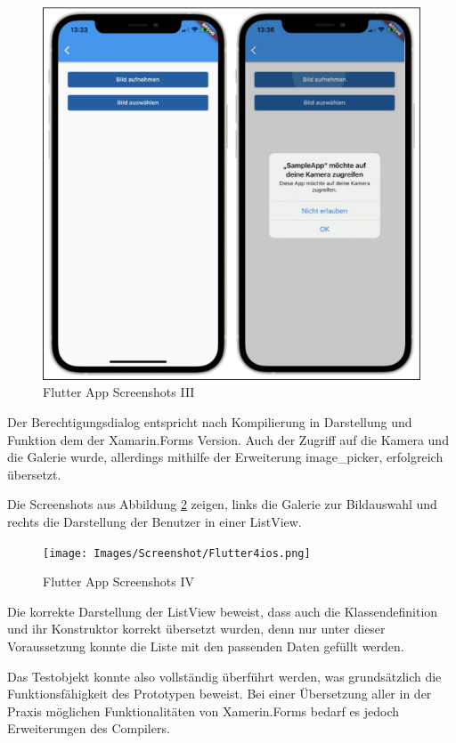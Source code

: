 \begin{figure}[!ht]
 \includegraphics[width=\textwidth,keepaspectratio]{Images/Screenshot/Flutter3ios.png}
 \caption{Flutter App Screenshots III}
 \label{fig:FlutterAppIII}
\end{figure}
Der Berechtigungsdialog entspricht nach Kompilierung in Darstellung und 
Funktion dem der Xamarin.Forms Version.  Auch der Zugriff auf die Kamera und die Galerie wurde, allerdings mithilfe der Erweiterung image\_picker, erfolgreich übersetzt.

Die Screenshots aus Abbildung \ref{fig:FlutterAppIV} zeigen,  links die Galerie zur Bildauswahl und rechts die Darstellung der Benutzer in einer ListView.  


 \newpage 
\begin{figure}[!ht]
 \texttt{[image: Images/Screenshot/Flutter4ios.png]}
 \caption{Flutter App Screenshots IV}
 \label{fig:FlutterAppIV}
\end{figure}
Die korrekte Darstellung der ListView beweist, dass auch die Klassendefinition und ihr Konstruktor korrekt übersetzt wurden, denn nur unter dieser Voraussetzung konnte die Liste mit den  passenden Daten gefüllt werden.

Das Testobjekt konnte also vollständig überführt werden, was grundsätzlich die 
Funktionsfähigkeit des Prototypen beweist.  Bei einer Übersetzung aller in der Praxis möglichen 
Funktionalitäten von Xamerin.Forms bedarf es jedoch Erweiterungen des Compilers. 


